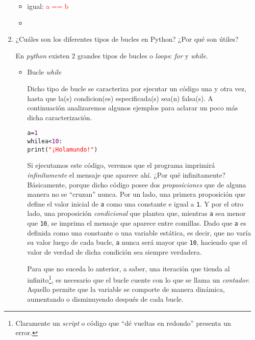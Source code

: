 \documentclass{article}
\begin{document}
\begin{enumerate}
\begin{itemize}
\item igual: \textcolor{red}{a == b}
\item 
\end{itemize}

\item ¿Cuáles son los diferentes tipos de bucles en Python? ¿Por qué son útiles?

\par \hspace{5pt} En \emph{python} existen 2 grandes tipos de bucles o \emph{loops}: \emph{for} y \emph{while}.

\begin{itemize}
\item Bucle \emph{while}

\par \hspace{5pt} Dicho tipo de bucle se caracteriza por ejecutar un código una y otra vez, hasta que la(s) condicion(es) especificada(s) sea(n) falsa(s). A continuación analizaremos algunos ejemplos para aclarar un poco más dicha caracterización.

\begin{tcolorbox}
\begin{alltt}
a = \textcolor{purple}{1}
while a < \textcolor{purple}{10}:
print(\textcolor{red}{"¡Hola mundo!"})
\end{alltt}        
\end{tcolorbox}

\par \hspace{5pt} Si ejecutamos este código, veremos que el programa imprimirá \emph{infinítamente} el mensaje que aparece ahí. ¿Por qué infinitamente? Básicamente, porque dicho código posee dos \emph{proposiciones} que de alguna manera no se ``cruzan'' nunca. Por un lado, una primera proposición que define el valor inicial de \verb|a| como una constante e igual a \verb|1|. Y por el otro lado, una proposición \emph{condicional} que plantea que, mientras \verb|a| sea menor que \verb|10|, se imprima el mensaje que aparece entre comillas.  Dado que \verb|a| es definida como una constante o una variable estática, es decir, que no varía su valor luego de cada bucle, \verb|a| nunca será mayor que \verb|10|, haciendo que el valor de verdad de dicha condición sea siempre verdadera.

\par \hspace{5pt} Para que no suceda lo anterior, a saber, una iteración que tienda al infinito\footnote
{
Claramente un \emph{script} o código que ``dé vueltas en redondo'' presenta un error.
},
 es necesario que el bucle cuente con lo que se llama un \emph{contador}. Aquello permite que la variable se comporte de manera dinámica, aumentando o disminuyendo después de cada bucle.


\end{itemize}
\end{enumerate}
\end{document}
